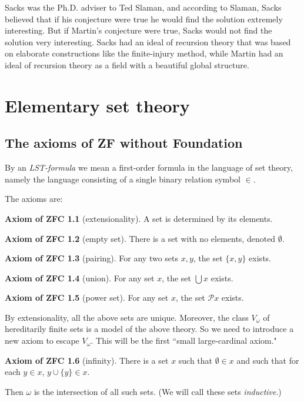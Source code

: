 \documentclass[12pt]{report}
\newcommand{\pset}{\mathcal{P}}
\newcommand{\dfn}[1]{\emph{#1}\index{#1}}
\theoremstyle{definition}
\newtheorem{axiomZFC}{Axiom of ZFC}
\begin{document}
Sacks was the Ph.D. adviser to Ted Slaman, and according to Slaman, Sacks believed that if his conjecture were true he would find the solution extremely interesting.
But if Martin's conjecture were true, Sacks would not find the solution very interesting.
Sacks had an ideal of recursion theory that was based on elaborate constructions like the finite-injury method, while Martin had an ideal of recursion theory as a field with a beautiful global structure.


\chapter{Elementary set theory}
\section{The axioms of ZF without Foundation}
By an \dfn{LST-formula} we mean a first-order formula in the language of set theory, namely the language consisting of a single binary relation symbol $\in$.

The axioms are:
\begin{axiomZFC}[extensionality]
    A set is determined by its elements.
\end{axiomZFC}
\begin{axiomZFC}[empty set]
    There is a set with no elements, denoted $\emptyset$.
\end{axiomZFC}
\begin{axiomZFC}[pairing]
    For any two sets $x,y$, the set $\{x, y\}$ exists.
\end{axiomZFC}
\begin{axiomZFC}[union]
    For any set $x$, the set $\bigcup x$ exists.
\end{axiomZFC}
\begin{axiomZFC}[power set]
    For any set $x$, the set $\pset x$ exists.
\end{axiomZFC}
    By extensionality, all the above sets are unique. Moreover, the class $V_\omega$ of hereditarily finite sets is a model of the above theory. So we need to introduce a new axiom to escape $V_\omega$. This will be the first ``small large-cardinal axiom."
\begin{axiomZFC}[infinity]
    There is a set $x$ such that $\emptyset \in x$ and such that for each $y \in x$, $y \cup \{y\} \in x$.
\end{axiomZFC}
    Then $\omega$ is the intersection of all such sets. (We will call these sets \dfn{inductive}.)
\end{document}
